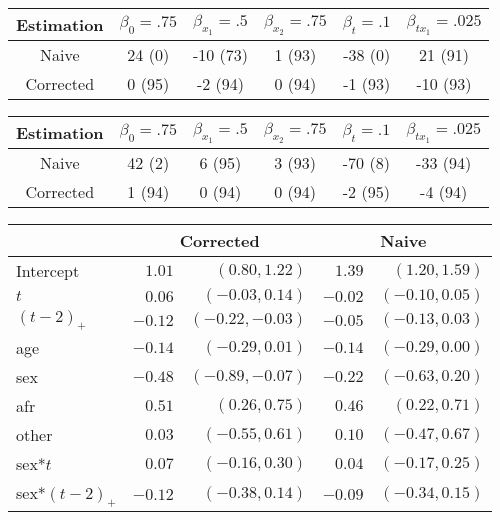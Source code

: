 \documentclass[12pt]{article}
\begin{document}
\begin{table}[h!]
\centering
\begin{tabular}{| c c c c c c  |} \hline
Estimation & $\beta_0 = .75$ & $\beta_{x_1} = .5$ & $\beta_{x_2} = .75 $ & $\beta_t =.1$ & $\beta_{t x_{1}} = .025$  \\ \hline
Naive      &    24             (0)       &   -10            (73)       &      1             (93)       &   -38             (0)       &    21            (91) \\
Corrected     &     0            (95)       &    -2            (94)       &      0             (94)       &    -1            (93)       &   -10            (93) \\ \hline
\end{tabular}
\end{table}


\begin{table}[h!]
\centering
\begin{tabular}{| c c c c c c  |} \hline
Estimation & $\beta_0 = .75$ & $\beta_{x_1} = .5$ & $\beta_{x_2} = .75 $ & $\beta_t =.1$ & $\beta_{t x_{1}} = .025$  \\ \hline
Naive      &    42             (2)       &     6            (95)       &     3            (93)       &   -70             (8)       &    -33             (94) \\
Corrected     &     1            (94)       &     0            (94)       &     0            (94)       &    -2            (95)       &     -4             (94) \\ \hline
\end{tabular}
\end{table}



\begin{table}[h]
\centering
\begin{tabular}{| l |  r r |  r r  |} \hline
& \multicolumn{2}{c|}{Corrected}   & \multicolumn{2}{|c|}{Naive}  \\ \hline
Intercept     & $  1.01 $ & $(  0.80  ,  1.22  )$ & $  1.39 $ &  $(  1.20    , 1.59  )$ \\
$t$           & $  0.06 $ & $( -0.03  ,  0.14  )$ & $ -0.02 $ &  $( -0.10    , 0.05  )$ \\
$(t-2)_+$     & $ -0.12 $ & $( -0.22  , -0.03  )$ & $ -0.05 $ &  $( -0.13    , 0.03  )$ \\
age           & $ -0.14 $ & $( -0.29  ,  0.01  )$ & $ -0.14 $ &  $( -0.29    , 0.00  )$ \\
sex           & $ -0.48 $ & $( -0.89  , -0.07  )$ & $ -0.22 $ &  $( -0.63    , 0.20  )$ \\
afr           & $  0.51 $ & $(  0.26  ,  0.75  )$ & $  0.46 $ &  $(  0.22    , 0.71  )$ \\
other         & $  0.03 $ & $( -0.55  ,  0.61  )$ & $  0.10 $ &  $( -0.47    , 0.67  )$ \\
sex*$t$       & $  0.07 $ & $( -0.16  ,  0.30  )$ & $  0.04 $ &  $( -0.17    , 0.25  )$ \\
sex*$(t-2)_+$ & $ -0.12 $ & $( -0.38  ,  0.14  )$ & $ -0.09 $ &  $( -0.34    , 0.15  )$ \\ \hline
\end{tabular} 
\end{table}
\end{document}
